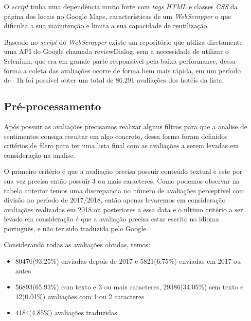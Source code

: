 O \emph{script} tinha uma dependência muito forte com \emph{tags HTML} e classes \emph{CSS} da página dos locais no Google Maps, características de um \emph{WebScrapper} o que dificulta a sua manutenção e limita a sua capacidade de reutilização.

Baseado no \emph{script} do \emph{WebScrapper} existe um repositório que utiliza diretamente uma API do Google chamada reviewDialog, sem a necessidade de utilizar o Selenium, que era em grande parte responsável pela baixa performance, dessa forma a coleta das avaliações ocorre de forma bem mais rápida, em um período de ~1h foi possível obter um total de 86.291 avaliações dos hotéis da lista.
\subsection{Pré-processamento}
\label{subsec:pre_processamento}

Após possuir as avaliações precisamos realizar alguns filtros para que a analise de sentimentos consiga resultar em algo concreto, dessa forma foram definidos critérios de filtro para ter uma lista final com as avaliações a serem levadas em consideração na analise.

O primeiro critério é que a avaliação precisa possuir conteúdo textual e este por sua vez precisa então possuir 3 ou mais caracteres. Como podemos observar na tabela anterior temos uma discrepancia no número de avaliações perceptível com divisão no período de 2017/2018, então apenas levaremos em consideração avaliações realizadas em 2018 ou posteriores a essa data e o ultimo critério a ser levado em consideração é que a avaliação precisa estar escrita no idioma português, e não ter sido traduzida pelo Google.




Considerando todas as avaliações obtidas, temos:

\begin{itemize}
	\item 80470(93.25\%) enviadas depois de 2017 e 5821(6.75\%) enviadas em 2017 ou antes
	\item 56893(65.93\%) com texto e 3 ou mais caracteres, 29386(34.05\%) sem texto e 12(0.01\%) avaliações com 1 ou 2 caracteres
	\item 4184(4.85\%) avaliações traduzidas
\end{itemize}

